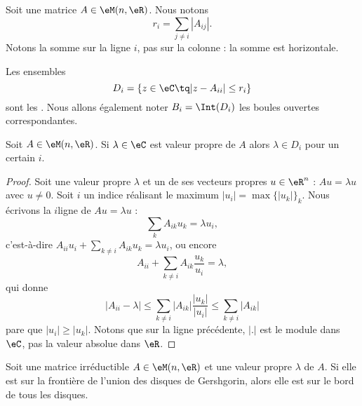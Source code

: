 Soit une matrice \( A\in\eM(n,\eR)\). Nous notons
\begin{equation}
	r_i=\sum_{j\neq i}| A_{ij} |.
\end{equation}
Notons la somme sur la ligne \( i\), pas sur la colonne : la somme est horizontale.
\begin{definition}
	Les ensembles
	\begin{equation}
		D_i=\{ z\in \eC\tq | z-A_{ii} |\leq r_i \}
	\end{equation}
	sont les . Nous allons également noter \( B_i=\Int(D_i)\) les boules ouvertes correspondantes.
\end{definition}

\begin{theorem}[Gershgorin]     \label{THOooUJNFooHpvCCF}
	Soit \( A\in \eM(n,\eR)\). Si \( \lambda\in \eC\) est valeur propre de \( A\) alors \(   \lambda\in D_i   \) pour un certain \( i\).
\end{theorem}

\begin{proof}
	Soit une valeur propre \( \lambda\) et un de ses vecteurs propres \( u\in \eR^n\) : \( Au=\lambda u\) avec \( u\neq 0\). Soit \( i\) un indice réalisant le maximum \( | u_i |=\max\{ | u_k | \}_k\). Nous écrivons la \( i\)\ieme ligne de \( Au=\lambda u\) :
	\begin{equation}
		\sum_kA_{ik}u_k=\lambda u_i,
	\end{equation}
	c'est-à-dire \( A_{ii}u_i+\sum_{k\neq i}A_{ik}u_k=\lambda u_i\), ou encore
	\begin{equation}
		A_{ii}+\sum_{k\neq i}A_{ik}\frac{ u_k }{ u_i }=\lambda,
	\end{equation}
	qui donne
	\begin{equation}
		| A_{ii} -\lambda|\leq \sum_{k\neq i}| A_{ik} |\frac{ | u_k | }{ | u_i | }\leq \sum_{k\neq i}| A_{ik} |
	\end{equation}
	pare que \( | u_i |\geq | u_k |\). Notons que sur la ligne précédente, \( | . |\) est le module dans \( \eC\), pas la valeur absolue dans \( \eR\).
\end{proof}

\begin{theorem}      \label{THOooTXAPooQqsBCj}
	Soit une matrice irréductible \( A\in \eM(n,\eR)\) et une valeur propre \( \lambda\) de \( A\). Si elle est sur la frontière de l'union des disques de Gershgorin, alors elle est sur le bord de tous les disques.
\end{theorem}

